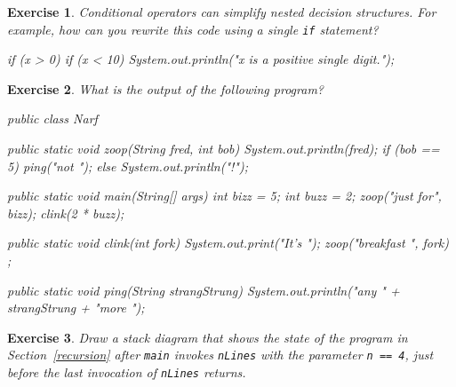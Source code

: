 \documentclass[12pt]{book}
\theoremstyle{exercise}
\newtheorem{exercise}{Exercise}[chapter]
\newcommand{\java}[1]{\lstinline{#1}} %
\begin{document}
\begin{exercise}
Conditional operators can simplify nested decision structures.
For example, how can you rewrite this code using a single \java{if} statement?

\begin{code}
    if (x > 0) {
        if (x < 10) {
            System.out.println("x is a positive single digit.");
        }
    }
\end{code}
\end{exercise}

\begin{exercise}
What is the output of the following program?

\begin{code}
public class Narf {

    public static void zoop(String fred, int bob) {
        System.out.println(fred);
        if (bob == 5) {
            ping("not ");
        } else {
            System.out.println("!");
        }
    }

    public static void main(String[] args) {
        int bizz = 5;
        int buzz = 2;
        zoop("just for", bizz);
        clink(2 * buzz);
    }

    public static void clink(int fork) {
        System.out.print("It's ");
        zoop("breakfast ", fork) ;
    }

    public static void ping(String strangStrung) {
        System.out.println("any " + strangStrung + "more ");
    }

}
\end{code}
\end{exercise}

\begin{exercise}
Draw a stack diagram that shows the state of the program in Section~\ref{recursion} after \java{main} invokes \java{nLines} with the parameter \java{n == 4}, just before the last invocation of \java{nLines} returns.
\end{exercise}
\end{document}

